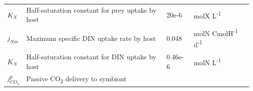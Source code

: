 \documentclass[]{elsarticle} %
\begin{document}
\begin{longtable}[c]{@{}llll@{}}
\begin{minipage}[t]{0.10\columnwidth}\raggedright\strut
\(K_X\)
\strut\end{minipage} &
\begin{minipage}[t]{0.48\columnwidth}\raggedright\strut
Half-saturation constant for prey uptake by host
\strut\end{minipage} &
\begin{minipage}[t]{0.09\columnwidth}\raggedright\strut
20e-6
\strut\end{minipage} &
\begin{minipage}[t]{0.23\columnwidth}\raggedright\strut
molX L\textsuperscript{-1}
\strut\end{minipage}\tabularnewline
\begin{minipage}[t]{0.10\columnwidth}\raggedright\strut
\(j_{Nm}\)
\strut\end{minipage} &
\begin{minipage}[t]{0.48\columnwidth}\raggedright\strut
Maximum specific DIN uptake rate by host
\strut\end{minipage} &
\begin{minipage}[t]{0.09\columnwidth}\raggedright\strut
0.048
\strut\end{minipage} &
\begin{minipage}[t]{0.23\columnwidth}\raggedright\strut
molN CmolH\textsuperscript{-1} d\textsuperscript{-1}
\strut\end{minipage}\tabularnewline
\begin{minipage}[t]{0.10\columnwidth}\raggedright\strut
\(K_N\)
\strut\end{minipage} &
\begin{minipage}[t]{0.48\columnwidth}\raggedright\strut
Half-saturation constant for DIN uptake by host
\strut\end{minipage} &
\begin{minipage}[t]{0.09\columnwidth}\raggedright\strut
0.46e-6
\strut\end{minipage} &
\begin{minipage}[t]{0.23\columnwidth}\raggedright\strut
molN L\textsuperscript{-1}
\strut\end{minipage}\tabularnewline
\begin{minipage}[t]{0.10\columnwidth}\raggedright\strut
\(j_{CO_2}^p\)
\strut\end{minipage} &
\begin{minipage}[t]{0.48\columnwidth}\raggedright\strut
Passive CO\textsubscript{2} delivery to symbiont
\strut\end{minipage} &

\end{longtable}
\end{document}
